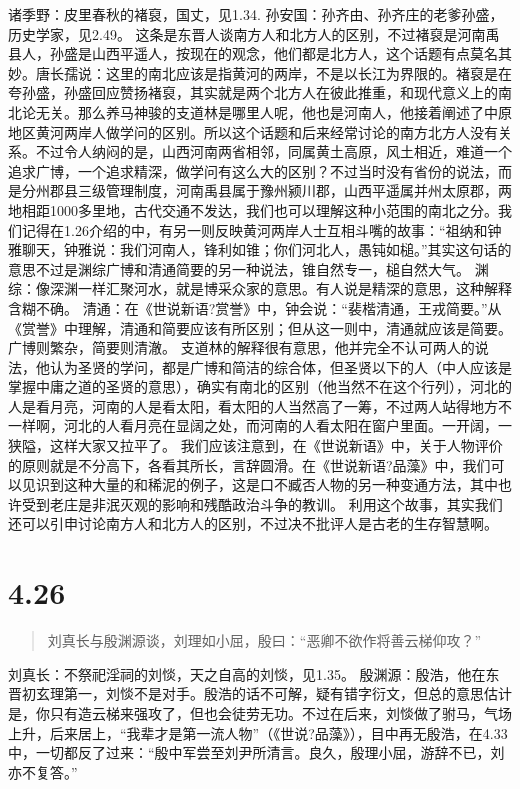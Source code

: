 \documentclass[]{book}
\begin{document}
诸季野：皮里春秋的褚裒，国丈，见1.34.
孙安国：孙齐由、孙齐庄的老爹孙盛，历史学家，见2.49。
这条是东晋人谈南方人和北方人的区别，不过褚裒是河南禹县人，孙盛是山西平遥人，按现在的观念，他们都是北方人，这个话题有点莫名其妙。唐长孺说：这里的南北应该是指黄河的两岸，不是以长江为界限的。褚裒是在夸孙盛，孙盛回应赞扬褚裒，其实就是两个北方人在彼此推重，和现代意义上的南北论无关。那么养马神骏的支道林是哪里人呢，他也是河南人，他接着阐述了中原地区黄河两岸人做学问的区别。所以这个话题和后来经常讨论的南方北方人没有关系。不过令人纳闷的是，山西河南两省相邻，同属黄土高原，风土相近，难道一个追求广博，一个追求精深，做学问有这么大的区别？不过当时没有省份的说法，而是分州郡县三级管理制度，河南禹县属于豫州颍川郡，山西平遥属并州太原郡，两地相距1000多里地，古代交通不发达，我们也可以理解这种小范围的南北之分。我们记得在1.26介绍的中，有另一则反映黄河两岸人士互相斗嘴的故事：``祖纳和钟雅聊天，钟雅说：我们河南人，锋利如锥；你们河北人，愚钝如槌。''其实这句话的意思不过是渊综广博和清通简要的另一种说法，锥自然专一，槌自然大气。
渊综：像深渊一样汇聚河水，就是博采众家的意思。有人说是精深的意思，这种解释含糊不确。
清通：在《世说新语?赏誉》中，钟会说：``裴楷清通，王戎简要。''从《赏誉》中理解，清通和简要应该有所区别；但从这一则中，清通就应该是简要。广博则繁杂，简要则清澈。
支道林的解释很有意思，他并完全不认可两人的说法，他认为圣贤的学问，都是广博和简洁的综合体，但圣贤以下的人（中人应该是掌握中庸之道的圣贤的意思），确实有南北的区别（他当然不在这个行列），河北的人是看月亮，河南的人是看太阳，看太阳的人当然高了一筹，不过两人站得地方不一样啊，河北的人看月亮在显阔之处，而河南的人看太阳在窗户里面。一开阔，一狭隘，这样大家又拉平了。
我们应该注意到，在《世说新语》中，关于人物评价的原则就是不分高下，各看其所长，言辞圆滑。在《世说新语?品藻》中，我们可以见识到这种大量的和稀泥的例子，这是口不臧否人物的另一种变通方法，其中也许受到老庄是非泯灭观的影响和残酷政治斗争的教训。
利用这个故事，其实我们还可以引申讨论南方人和北方人的区别，不过决不批评人是古老的生存智慧啊。

\section{4.26}\label{section-204}

\begin{quote}
刘真长与殷渊源谈，刘理如小屈，殷曰：``恶卿不欲作将善云梯仰攻？''
\end{quote}

刘真长：不祭祀淫祠的刘惔，天之自高的刘惔，见1.35。
殷渊源：殷浩，他在东晋初玄理第一，刘惔不是对手。殷浩的话不可解，疑有错字衍文，但总的意思估计是，你只有造云梯来强攻了，但也会徒劳无功。不过在后来，刘惔做了驸马，气场上升，后来居上，``我辈才是第一流人物''（《世说?品藻》），目中再无殷浩，在4.33中，一切都反了过来：``殷中军尝至刘尹所清言。良久，殷理小屈，游辞不已，刘亦不复答。''
\end{document}
